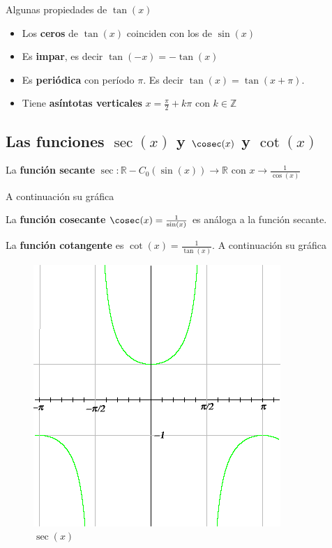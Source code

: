 \begin{property}
Algunas propiedades de $\tan(x)$

\begin{itemize}
\item Los \textbf{ceros} de $\tan(x)$ coinciden con los de $\sin(x)$
	
\item Es \textbf{impar}, es decir $\tan(-x) = -\tan(x)$
	
\item Es \textbf{periódica} con período $\pi$.  Es decir $\tan(x) = \tan(x+\pi)$.
	
\item Tiene \textbf{asíntotas verticales} $x = \frac{\pi}{2} + k \pi$ con $k \in \mathbb{Z}$
\end{itemize}
\end{property}

\subsection{Las funciones $\sec(x)$ y $\cosec(x)$ y $\cot(x)$}

\begin{definition} 
La \textbf{función secante}  $\sec : \mathbb{R} - C_0(\sin(x)) \to \mathbb{R}$ con $x \to \frac{1}{\cos(x)} $ 

A continuación su gráfica

La \textbf{función cosecante}  $\cosec(x) = \frac{1}{\sin(x)}$ es análoga a la función secante.

La \textbf{función cotangente}  es $\cot(x) = \frac{1}{\tan(x)}$.  A continuación su gráfica
\end{definition}

\begin{figure}[h]
\centering\includegraphics[scale=0.5]{images/01_precalculo/sec.png}
\caption{$\sec(x)$}
\end{figure}


